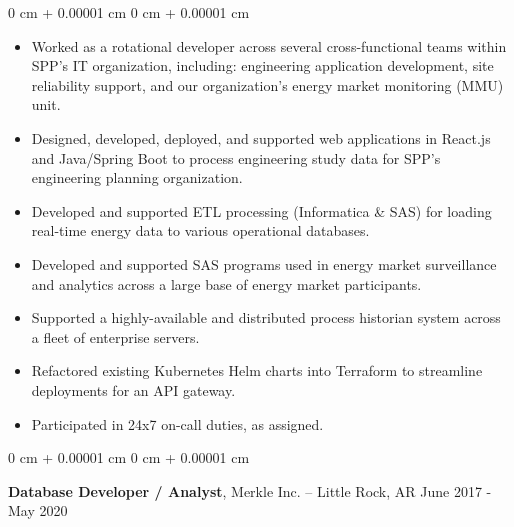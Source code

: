 \documentclass[10pt, letterpaper]{article}
\newenvironment{highlights}{
    \begin{itemize}[
        topsep=0.10 cm,
        parsep=0.10 cm,
        partopsep=0pt,
        itemsep=0pt,
        leftmargin=0 cm + 10pt
    ]
}{
    \end{itemize}
} %
\newenvironment{onecolentry}{
    \begin{adjustwidth}{
        0 cm + 0.00001 cm
    }{
        0 cm + 0.00001 cm
    }
}{
    \end{adjustwidth}
} %
\newenvironment{twocolentry}[2][]{
    \onecolentry
    \def\secondColumn{#2}
    \setcolumnwidth{\fill, 4.5 cm}
    \begin{paracol}{2}
}{
    \switchcolumn \raggedleft \secondColumn
    \end{paracol}
    \endonecolentry
} %
\begin{document}
        \vspace{0.10 cm}
        \begin{onecolentry}
            \begin{highlights}
                \item Worked as a rotational developer across several cross-functional teams within SPP's IT organization, including: engineering application development, site reliability support, and our organization's energy market monitoring (MMU) unit.
                \item Designed, developed, deployed, and supported web applications in React.js and Java/Spring Boot to process engineering study data for SPP's engineering planning organization.
                \item Developed and supported ETL processing (Informatica \& SAS) for loading real-time energy data to various operational databases.
                \item Developed and supported SAS programs used in energy market surveillance and analytics across a large base of energy market participants.
                \item Supported a highly-available and distributed process historian system across a fleet of enterprise servers.
                \item Refactored existing Kubernetes Helm charts into Terraform to streamline deployments for an API gateway.
                \item Participated in 24x7 on-call duties, as assigned.
            \end{highlights}
        \end{onecolentry}


        \vspace{0.75 cm}

        \begin{twocolentry}{
            June 2017 - May 2020
        }
            \textbf{Database Developer / Analyst}, Merkle Inc. -- Little Rock, AR\end{twocolentry}
\end{document}
